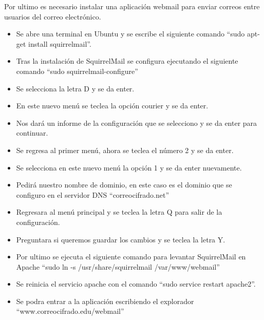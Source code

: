 \documentclass[12pt,oneside,onecolumn,openany]{report}
\begin{document}
Por ultimo es necesario instalar una aplicación webmail para enviar correos entre usuarios del correo electrónico.
\begin{itemize}
 \item Se abre una terminal en Ubuntu y se escribe el siguiente comando “sudo apt-get install squirrelmail”.
 \item Tras la instalación de SquirrelMail se configura ejecutando el siguiente comando “sudo squirrelmail-configure”
 \item Se selecciona la letra D y se da enter.
 \item En este nuevo menú se teclea la opción courier y se da enter.
 \item Nos dará un informe de la configuración que se selecciono y se da enter para continuar.
 \item Se regresa al primer menú, ahora se teclea el número 2 y se da enter.
 \item Se selecciona en este nuevo menú la opción 1 y se da enter nuevamente.
 \item Pedirá nuestro nombre de dominio, en este caso es el dominio que se configuro en el servidor DNS “correocifrado.net”
 \item Regresara al menú principal y se teclea la letra Q para salir de la configuración.
 \item Preguntara si queremos guardar los cambios y se teclea la letra Y.
 \item Por ultimo se ejecuta el siguiente comando para levantar SquirrelMail en Apache “sudo ln -s /usr/share/squirrelmail /var/www/webmail”
 \item Se reinicia el servicio apache con el comando “sudo service restart apache2”.
 \item Se podra entrar a la aplicación escribiendo el explorador “www.correocifrado.edu/webmail”
\end{itemize}
\end{document}

